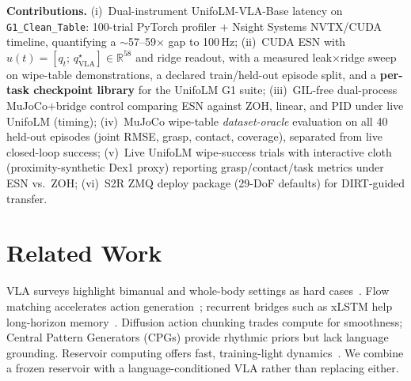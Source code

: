 \documentclass[conference]{IEEEtran}
\begin{document}
\textbf{Contributions.}
(i)~Dual-instrument UnifoLM-VLA-Base latency on \texttt{G1\_Clean\_Table}: 100-trial PyTorch profiler + Nsight Systems NVTX/CUDA timeline, quantifying a $\sim$57--59$\times$ gap to 100\,Hz;
(ii)~CUDA ESN with $u(t)=[q_t;\,q^{\star}_{\mathrm{VLA}}]\in\mathbb{R}^{58}$ and ridge readout, with a measured leak$\times$ridge sweep on wipe-table demonstrations, a declared train/held-out episode split, and a \textbf{per-task checkpoint library} for the UnifoLM G1 suite;
(iii)~GIL-free dual-process MuJoCo$+$bridge control comparing ESN against ZOH, linear, and PID under live UnifoLM (timing);
(iv)~MuJoCo wipe-table \emph{dataset-oracle} evaluation on all 40 held-out episodes (joint RMSE, grasp, contact, coverage), separated from live closed-loop success;
(v)~Live UnifoLM wipe-success trials with interactive cloth (proximity-synthetic Dex1 proxy) reporting grasp/contact/task metrics under ESN vs.\ ZOH;
(vi)~S2R ZMQ deploy package (29-DoF defaults) for DIRT-guided transfer.

\section{Related Work}
VLA surveys highlight bimanual and whole-body settings as hard cases~\cite{VLA_Review2026}.
Flow matching accelerates action generation~\cite{Preprints2026}; recurrent bridges such as xLSTM help long-horizon memory~\cite{Notes2Self2026}.
Diffusion action chunking trades compute for smoothness; Central Pattern Generators (CPGs) provide rhythmic priors but lack language grounding.
Reservoir computing offers fast, training-light dynamics~\cite{Jaeger2001,Caoetal2023}.
We combine a frozen reservoir with a language-conditioned VLA rather than replacing either.
\end{document}

